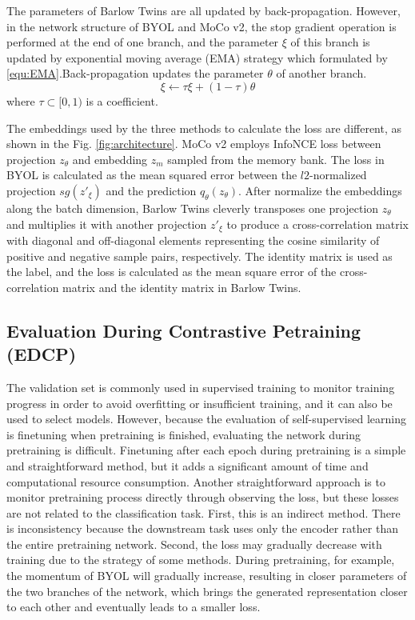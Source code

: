 \documentclass[conference]{IEEEtran}
\begin{document}
The parameters of Barlow Twins are all updated by back-propagation.
However, in the network structure of BYOL and MoCo v2, the stop gradient operation is performed at the end of one branch, and the parameter $\xi$ of this branch is updated by exponential moving average (EMA) strategy which formulated by \eqref{equ:EMA}.Back-propagation updates the parameter $\theta$ of another branch.
 \begin{equation}\label{equ:EMA}
\xi \leftarrow \tau \xi+(1-\tau) \theta
\end{equation}
where $\tau\subset[0, 1)$ is a coefficient.

The embeddings used by the three methods to calculate the loss are different, as shown in the Fig. \ref{fig:architecture}.
MoCo v2 employs InfoNCE loss between projection $z_\theta$ and embedding $z_m$ sampled from the memory bank.
The loss in BYOL is calculated as the mean squared error between the $l2$-normalized projection $sg(z'_\xi)$ and the prediction $q_\theta(z_\theta)$.
After normalize the embeddings along the batch dimension,
Barlow Twins cleverly transposes one projection $z_\theta$ and multiplies it with another projection $z'_\xi$ to produce a cross-correlation matrix with diagonal and off-diagonal elements representing the cosine similarity of positive and negative sample pairs, respectively. The identity matrix is used as the label, and the loss is calculated as the mean square error of the cross-correlation matrix and the identity matrix in Barlow Twins.


\subsection{Evaluation During Contrastive Petraining (EDCP) }
The validation set is commonly used in supervised training to monitor training progress in order to avoid overfitting or insufficient training, and it can also be used to select models.
However, because the evaluation of self-supervised learning is finetuning when pretraining is finished, evaluating the network during pretraining is difficult.
Finetuning after each epoch during pretraining is a simple and straightforward method, but it adds a significant amount of time and computational resource consumption.
Another straightforward approach is to monitor pretraining process directly through observing the loss, but these losses are not related to the classification task.
First, this is an indirect method. There is inconsistency because the downstream task uses only the encoder rather than the entire pretraining network.
Second, the loss may gradually decrease with training due to the strategy of some methods. During pretraining, for example, the momentum of BYOL will gradually increase, resulting in closer parameters of the two branches of the network, which brings the generated representation closer to each other and eventually leads to a smaller loss.
\end{document}
